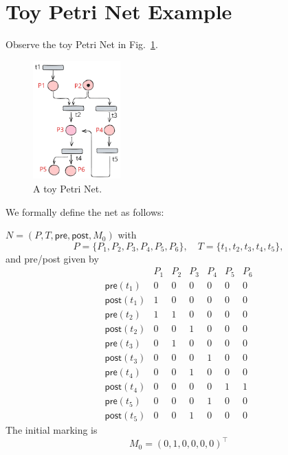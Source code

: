 

\section{Toy Petri Net Example}
\label{appendix:toyPN}

Observe the toy Petri Net in Fig.~\ref{fig:toyPN}.

\begin{figure}[H]
	\centering
	\includegraphics[width=0.3\textwidth]{plots/toy_PN_example.pdf}
	\caption{A toy Petri Net.}
	\label{fig:toyPN}
\end{figure}



We formally define the net as follows:

 \(N=(P,T,\mathsf{pre},\mathsf{post},M_0)\) with
\[
P=\{P_1,P_2,P_3,P_4,P_5,P_6\},\quad
T=\{t_1,t_2,t_3,t_4,t_5\},
\]
and pre/post given by
\[
\begin{array}{c|cccccc}
	& P_1 & P_2 & P_3 & P_4 & P_5 & P_6 \\ \hline
	\mathsf{pre}(t_1)  & 0 & 0 & 0 & 0 & 0 & 0 \\
	\mathsf{post}(t_1) & 1 & 0 & 0 & 0 & 0 & 0 \\ \hline
	\mathsf{pre}(t_2)  & 1 & 1 & 0 & 0 & 0 & 0 \\
	\mathsf{post}(t_2) & 0 & 0 & 1 & 0 & 0 & 0 \\ \hline
	\mathsf{pre}(t_3)  & 0 & 1 & 0 & 0 & 0 & 0 \\
	\mathsf{post}(t_3) & 0 & 0 & 0 & 1 & 0 & 0 \\ \hline
	\mathsf{pre}(t_4)  & 0 & 0 & 1 & 0 & 0 & 0 \\
	\mathsf{post}(t_4) & 0 & 0 & 0 & 0 & 1 & 1 \\ \hline
	\mathsf{pre}(t_5)  & 0 & 0 & 0 & 1 & 0 & 0 \\
	\mathsf{post}(t_5) & 0 & 0 & 1 & 0 & 0 & 0
\end{array}
\]
The initial marking is
\[
M_0 = (0,1,0,0,0,0)^\top 
\]

